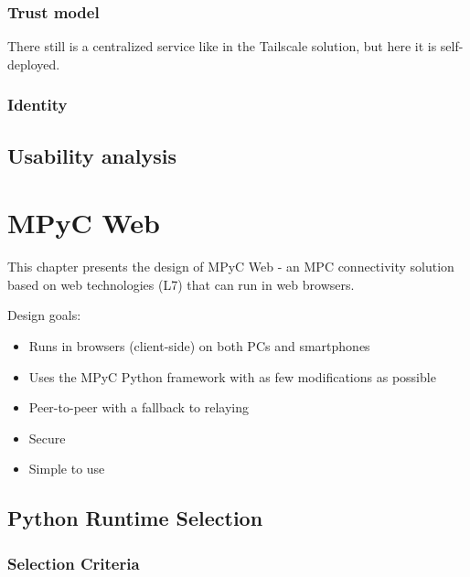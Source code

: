 \subsection{Trust model}\label{thesis__080-headscale.md__trust-model}

There still is a centralized service like in the Tailscale solution, but here it is self-deployed.

\subsection{Identity}\label{thesis__080-headscale.md__identity}

\section{Usability analysis}\label{thesis__080-headscale.md__usability-analysis}

\label{thesis__090-mpyc-web.md}
\chapter{MPyC Web}\label{thesis__090-mpyc-web.md__mpyc-web}

This chapter presents the design of MPyC Web - an MPC connectivity solution based on web technologies (L7) that can run in web browsers.

Design goals:

\begin{itemize}
\tightlist
\item
  Runs in browsers (client-side) on both PCs and smartphones
\item
  Uses the MPyC Python framework with as few modifications as possible
\item
  Peer-to-peer with a fallback to relaying
\item
  Secure
\item
  Simple to use
\end{itemize}

\section{Python Runtime Selection}\label{thesis__090-mpyc-web.md__python-runtime-selection}

\subsection{Selection Criteria}\label{thesis__090-mpyc-web.md__selection-criteria}

